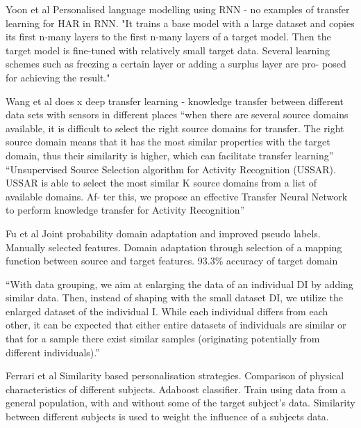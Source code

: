 Yoon et al
Personalised language modelling using RNN - no examples of transfer learning for HAR in RNN. "It trains a base model with a large dataset and copies its first n-many layers to the first n-many layers of a target model. Then the target model is fine-tuned with relatively small target data. Several learning schemes such as freezing a certain layer or adding a surplus layer are pro- posed for achieving the result."\cite{Yoon2017}

Wang et al does x
deep transfer learning - knowledge transfer between different data sets with sensors in different places\cite{Wang2018a} ``when there are several source domains available, it is difficult to select the right source domains for transfer. The right source domain means that it has the most similar properties with the target domain, thus their similarity is higher, which can facilitate transfer learning'' ``Unsupervised Source Selection algorithm for Activity Recognition (USSAR). USSAR is able to select the most similar K source domains from a list of available domains. Af- ter this, we propose an effective Transfer Neural Network to perform knowledge transfer for Activity Recognition''

Fu et al
Joint probability domain adaptation and improved pseudo labels\cite{Fu2021}. Manually selected features. Domain adaptation through selection of a mapping function between source and target features. 93.3\% accuracy of target domain


``With data grouping, we aim at enlarging the data of an individual DI by adding similar data. Then, instead of shaping with the small dataset DI, we utilize the enlarged dataset of the individual I. While each individual differs from each other, it can be expected that either entire datasets of individuals are similar or that for a sample there exist similar samples (originating potentially from different individuals).''\cite{Schneider2021}

Ferrari et al
Similarity based personalisation strategies. Comparison of physical characteristics of different subjects\cite{Ferrari2020}. Adaboost classifier. Train using data from a general population, with and without some of the target subject's data. Similarity between different subjects is used to weight the influence of a subjects data.

